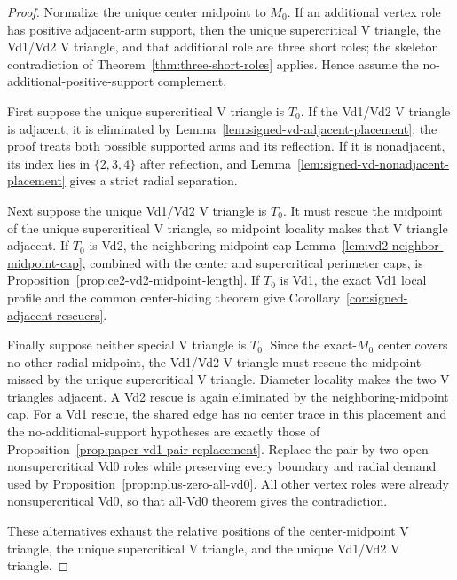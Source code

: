 \begin{proof}
Normalize the unique center midpoint to $M_0$.  If an additional vertex role
has positive adjacent-arm support, then the unique supercritical V triangle, the
Vd1/Vd2 V triangle, and that additional role are three short roles; the skeleton
contradiction of Theorem~\ref{thm:three-short-roles} applies.  Hence assume the
no-additional-positive-support complement.

First suppose the unique supercritical V triangle is $T_0$.  If the Vd1/Vd2 V triangle is
adjacent, it is eliminated by
Lemma~\ref{lem:signed-vd-adjacent-placement}; the proof treats both possible
supported arms and its reflection.  If it is nonadjacent, its index lies in
$\{2,3,4\}$ after reflection, and
Lemma~\ref{lem:signed-vd-nonadjacent-placement} gives a strict radial
separation.

Next suppose the unique Vd1/Vd2 V triangle is $T_0$.  It must rescue the midpoint of
the unique supercritical V triangle, so midpoint locality makes that V triangle adjacent.
If $T_0$ is Vd2, the neighboring-midpoint cap
Lemma~\ref{lem:vd2-neighbor-midpoint-cap}, combined with the center and
supercritical perimeter caps, is
Proposition~\ref{prop:ce2-vd2-midpoint-length}.  If $T_0$ is Vd1, the exact
Vd1 local profile and the common center-hiding theorem give
Corollary~\ref{cor:signed-adjacent-rescuers}.

Finally suppose neither special V triangle is $T_0$.  Since the exact-$M_0$ center
covers no other radial midpoint, the Vd1/Vd2 V triangle must rescue the midpoint
missed by the unique supercritical V triangle.  Diameter locality makes the two V triangles
adjacent.  A Vd2 rescue is again eliminated by the neighboring-midpoint cap.
For a Vd1 rescue, the shared edge has no center trace in this placement and the
no-additional-support hypotheses are exactly those of
Proposition~\ref{prop:paper-vd1-pair-replacement}.  Replace the pair by two
open nonsupercritical Vd0 roles while preserving every boundary and radial
demand used by Proposition~\ref{prop:nplus-zero-all-vd0}.  All other vertex
roles were already nonsupercritical Vd0, so that all-Vd0 theorem gives the
contradiction.

These alternatives exhaust the relative positions of the center-midpoint V triangle,
the unique supercritical V triangle, and the unique Vd1/Vd2 V triangle.
\end{proof}
